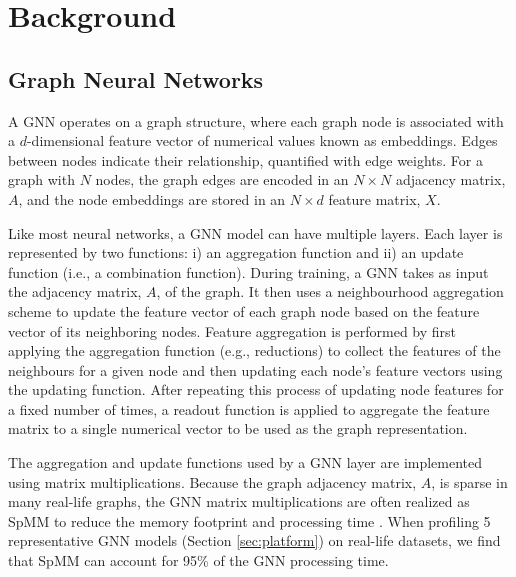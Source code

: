 \vspace{-3mm}
\section{Background}
\vspace{-2mm}
\subsection{Graph Neural Networks}
\vspace{-2mm}

A GNN operates on a graph structure, where each graph node is associated with a
$d$-dimensional feature vector of numerical values known as embeddings. Edges between nodes indicate their relationship, quantified with edge weights. 
For a graph with $N$ nodes, the graph edges
are encoded in an $N \times N$ adjacency matrix, $A$, and the node embeddings are stored in an $N \times d$ feature matrix, $X$. 

Like most neural networks, a GNN model can have multiple layers. Each layer is represented by two functions: i) an aggregation function
and ii) an update function (i.e., a combination function). During training, a GNN takes as input the adjacency matrix, $A$, of the graph.
It then uses a neighbourhood aggregation scheme to update the feature vector of each graph node based on the feature vector of its
neighboring nodes. Feature aggregation is performed by first applying the aggregation function (e.g., reductions)
to collect the features of the neighbours for a given node and then updating each node's feature vectors using the updating
function. After repeating this process of updating node features for a fixed number of times, a readout function is
applied to aggregate the feature matrix to a single numerical vector to be used as the graph representation.

The aggregation and update functions used by a GNN layer are implemented using matrix multiplications.
Because the graph adjacency matrix, $A$, is sparse in many real-life graphs, the GNN matrix multiplications are often realized as SpMM to reduce the memory footprint and processing time \cite{huang2021understanding}. When profiling 5 representative GNN models (Section \ref{sec:platform}) on real-life datasets, we find that SpMM can account for 95\% of the GNN processing time.


